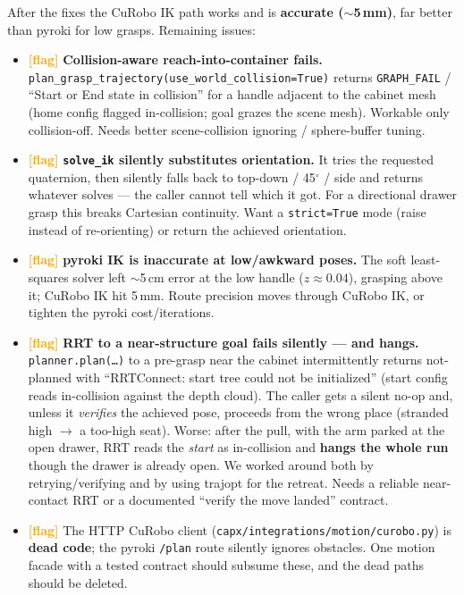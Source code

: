 \documentclass[11pt]{article}
\newcommand{\flag}{\textcolor{orange}{\textbf{[flag]}}}
\newcommand{\code}[1]{\texttt{#1}}
\begin{document}
\noindent After the fixes the CuRobo IK path works and is \textbf{accurate ($\sim$5\,mm)},
far better than pyroki for low grasps. Remaining issues:

\begin{itemize}
  \item \flag{} \textbf{Collision-aware reach-into-container fails.}
        \code{plan\_grasp\_trajectory(use\_world\_collision=True)} returns
        \code{GRAPH\_FAIL} / ``Start or End state in collision'' for a handle adjacent to the
        cabinet mesh (home config flagged in-collision; goal grazes the scene mesh). Workable
        only collision-off. Needs better scene-collision ignoring / sphere-buffer tuning.
  \item \flag{} \textbf{\code{solve\_ik} silently substitutes orientation.} It tries the
        requested quaternion, then silently falls back to top-down / 45$^\circ$ / side and
        returns whatever solves --- the caller cannot tell which it got. For a directional
        drawer grasp this breaks Cartesian continuity. Want a \code{strict=True} mode (raise
        instead of re-orienting) or return the achieved orientation.
  \item \flag{} \textbf{pyroki IK is inaccurate at low/awkward poses.} The soft
        least-squares solver left $\sim$5\,cm error at the low handle ($z\!\approx\!0.04$),
        grasping above it; CuRobo IK hit 5\,mm. Route precision moves through CuRobo IK, or
        tighten the pyroki cost/iterations.
  \item \flag{} \textbf{RRT to a near-structure goal fails silently --- and hangs.}
        \code{planner.plan(\dots)} to a pre-grasp near the cabinet intermittently returns
        not-planned with ``RRTConnect: start tree could not be initialized'' (start config
        reads in-collision against the depth cloud). The caller gets a silent no-op and,
        unless it \emph{verifies} the achieved pose, proceeds from the wrong place (stranded
        high $\to$ a too-high seat). Worse: after the pull, with the arm parked at the open
        drawer, RRT reads the \emph{start} as in-collision and \textbf{hangs the whole run}
        though the drawer is already open. We worked around both by retrying/verifying and by
        using trajopt for the retreat. Needs a reliable near-contact RRT or a documented
        ``verify the move landed'' contract.
  \item \flag{} The HTTP CuRobo client (\code{capx/integrations/motion/curobo.py}) is
        \textbf{dead code}; the pyroki \code{/plan} route silently ignores obstacles. One
        motion facade with a tested contract should subsume these, and the dead paths should
        be deleted.
\end{itemize}
\end{document}
